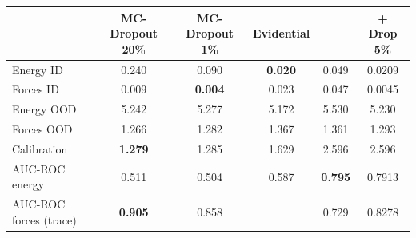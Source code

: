 \centering
\begin{tabular}{lccccc}
\toprule
{} & MC-Dropout 20\% & MC-Dropout 1\% & Evidential & \oursacro{} & \oursacro{} + Drop 5\%\\
\midrule
Energy ID  &   0.240 & 0.090 & \textbf{0.020} & 0.049 & 0.0209\\
Forces ID  &   0.009 & \textbf{0.004} & 0.023 & 0.047 & 0.0045 \\
Energy OOD &   5.242 & 5.277 & 5.172 & 5.530 & 5.230\\
Forces OOD &   1.266 & 1.282 & 1.367 & 1.361 & 1.293 \\
\midrule
Calibration    &   \textbf{1.279} & 1.285 & 1.629 & 2.596 & 2.596 \\
\midrule
AUC-ROC energy &   0.511 & 0.504 & 0.587 & \textbf{0.795} & 0.7913\\
AUC-ROC forces (trace)  & \textbf{0.905} & 0.858 & \noindent\rule{0.8cm}{0.6pt} & 0.729 & 0.8278\\
\bottomrule
\end{tabular}